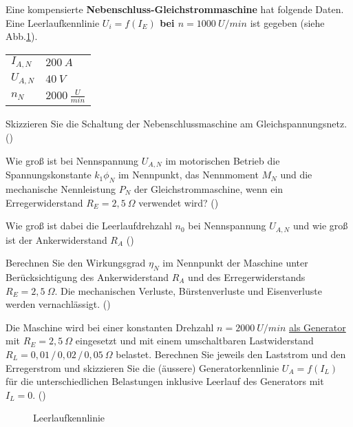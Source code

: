 \begin{question}[section=2,name={15.06.2016},mode=exm,type=bsp,tags={20160615}]
Eine kompensierte \textbf{Nebenschluss-Gleichstrommaschine} hat folgende Daten. Eine Leerlaufkennlinie \textbf{$U_i=f(I_E)$ bei $n=1000~U/min$} ist gegeben (siehe Abb.\ref{fig:20160615}).\\
\begin{tabular}{L{2cm}l}
$I_{A,N}$ \dotfill &$200~A$\\
$U_{A,N}$ \dotfill & $40~V$ \\
$n_N$ \dotfill & $2000~\frac{U}{min}$
\end{tabular}
\begin{compactenum}
\item Skizzieren Sie die Schaltung der Nebenschlussmaschine am Gleichspannungsnetz. ()
\item Wie groß ist bei Nennspannung $U_{A,N}$ im motorischen Betrieb die Spannungskonstante $k_1 \phi_N$ im Nennpunkt, das Nennmoment $M_N$ und die mechanische Nennleistung $P_N$ der Gleichstrommaschine, wenn ein Erregerwiderstand $R_E=2,5~\Omega$ verwendet wird? ()
\item Wie groß ist dabei die Leerlaufdrehzahl $n_0$ bei Nennspannung $U_{A,N}$ und wie groß ist der Ankerwiderstand $R_A$ ()
\item Berechnen Sie den Wirkungsgrad $\eta_N$ im Nennpunkt der Maschine unter Berücksichtigung des Ankerwiderstand $R_A$ und des Erregerwiderstands $R_E = 2,5~\Omega$. Die mechanischen Verluste, Bürstenverluste und Eisenverluste werden vernachlässigt. ()
\item Die Maschine wird bei einer konstanten Drehzahl $n=2000~U/min$ \underline{als Generator} mit $R_E =2,5~\Omega$ eingesetzt und mit einem umschaltbaren Lastwiderstand $R_L = 0,01\, /\, 0,02\, /\, 0,05 ~\Omega$ belastet. Berechnen Sie jeweils den Laststrom und den Erregerstrom und skizzieren Sie die (äussere) Generatorkennlinie $U_A=f(I_L)$ für die unterschiedlichen Belastungen inklusive Leerlauf des Generators mit $I_L = 0$. ()
\end{compactenum}
\begin{figure}[H]
\caption{Leerlaufkennlinie} \label{fig:20160615}
\end{figure}
\end{question}

